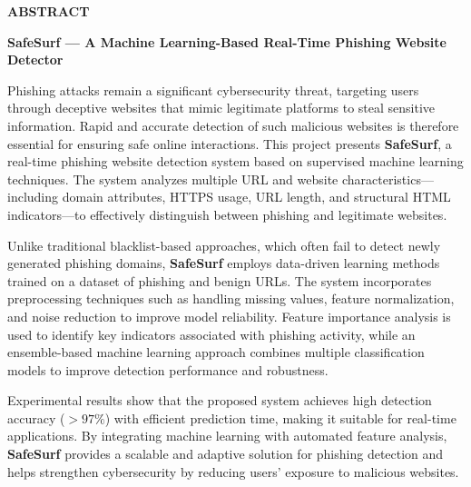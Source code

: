 \begin{center}
{\bfseries\fontsize{16}{18}\selectfont ABSTRACT}
\end{center}


\vspace{0.5cm}

\noindent
\textbf{SafeSurf — A Machine Learning-Based Real-Time Phishing Website Detector}

\vspace{0.5cm}

\noindent
Phishing attacks remain a significant cybersecurity threat, targeting users through deceptive websites that mimic legitimate platforms to steal sensitive information. Rapid and accurate detection of such malicious websites is therefore essential for ensuring safe online interactions. This project presents \textbf{SafeSurf}, a real-time phishing website detection system based on supervised machine learning techniques. The system analyzes multiple URL and website characteristics—including domain attributes, HTTPS usage, URL length, and structural HTML indicators—to effectively distinguish between phishing and legitimate websites.

\vspace{0.3cm}

\noindent
Unlike traditional blacklist-based approaches, which often fail to detect newly generated phishing domains, \textbf{SafeSurf} employs data-driven learning methods trained on a dataset of phishing and benign URLs. The system incorporates preprocessing techniques such as handling missing values, feature normalization, and noise reduction to improve model reliability. Feature importance analysis is used to identify key indicators associated with phishing activity, while an ensemble-based machine learning approach combines multiple classification models to improve detection performance and robustness.

\vspace{0.3cm}

\noindent
Experimental results show that the proposed system achieves high detection accuracy ($> 97\%$) with efficient prediction time, making it suitable for real-time applications. By integrating machine learning with automated feature analysis, \textbf{SafeSurf} provides a scalable and adaptive solution for phishing detection and helps strengthen cybersecurity by reducing users’ exposure to malicious websites.

\vspace{1cm}


